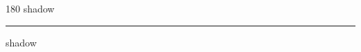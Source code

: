 
\begin{frame}
\begin{center}
\begin{turn}{180}
{\fontsize{2.5cm}{1em}\selectfont shadow}
\end{turn}
\vspace{1em}\par  
\hrule
\vspace{1em}\par  
{\fontsize{2.5cm}{1em}\selectfont shadow}
\end{center}
\end{frame}
